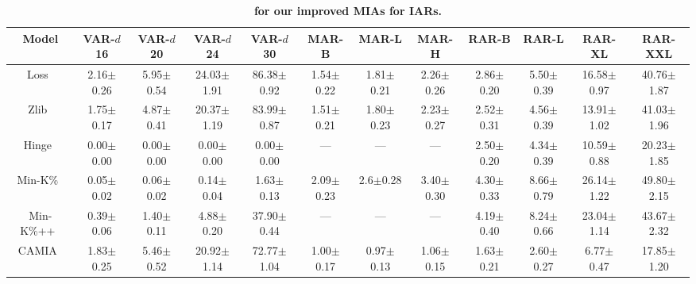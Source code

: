 \begin{table}[h!]
    \centering
    \tiny
\caption{\textbf{\tprat for our improved MIAs for IARs.}}
\setlength{\tabcolsep}{3pt}
\begin{tabular}{cccccccccccc}
\toprule
        Model & VAR-$\mathit{d}$16 & VAR-$\mathit{d}$20 & VAR-$\mathit{d}$24 & VAR-$\mathit{d}$30 & MAR-B & MAR-L & MAR-H & RAR-B & RAR-L & RAR-XL & RAR-XXL \\
\midrule
Loss~\citep{yeom2018lossmia} & 2.16{\tiny $\pm$0.26} & 5.95{\tiny $\pm$0.54} & 24.03{\tiny $\pm$1.91} & 86.38{\tiny $\pm$0.92} & 1.54{\tiny $\pm$0.22} & 1.81{\tiny $\pm$0.21} & 2.26{\tiny $\pm$0.26} & 2.86{\tiny $\pm$0.20} & 5.50{\tiny $\pm$0.39} & 16.58{\tiny $\pm$0.97} & 40.76{\tiny $\pm$1.87} \\
Zlib~\citep{carlini2021extractLLM} & 1.75{\tiny $\pm$0.17} & 4.87{\tiny $\pm$0.41} & 20.37{\tiny $\pm$1.19} & 83.99{\tiny $\pm$0.87} & 1.51{\tiny $\pm$0.21} & 1.80{\tiny $\pm$0.23} & 2.23{\tiny $\pm$0.27} & 2.52{\tiny $\pm$0.31} & 4.56{\tiny $\pm$0.39} & 13.91{\tiny $\pm$1.02} & 41.03{\tiny $\pm$1.96} \\
Hinge~\citep{bertran2024scalable} & 0.00{\tiny $\pm$0.00} & 0.00{\tiny $\pm$0.00} & 0.00{\tiny $\pm$0.00} & 0.00{\tiny $\pm$0.00} & --- & --- & --- & 2.50{\tiny $\pm$0.20} & 4.34{\tiny $\pm$0.39} & 10.59{\tiny $\pm$0.88} & 20.23{\tiny $\pm$1.85} \\
Min-K\%~\citep{shi2024detecting} & 0.05{\tiny $\pm$0.02} & 0.06{\tiny $\pm$0.02} & 0.14{\tiny $\pm$0.04} & 1.63{\tiny $\pm$0.13} & 2.09{\tiny $\pm$0.23} & 2.6{\tiny $\pm$0.28} & 3.40{\tiny $\pm$0.30} & 4.30{\tiny $\pm$0.33} & 8.66{\tiny $\pm$0.79} & 26.14{\tiny $\pm$1.22} & 49.80{\tiny $\pm$2.15} \\
Min-K\%++~\citep{zhang2024min} & 0.39{\tiny $\pm$0.06} & 1.40{\tiny $\pm$0.11} & 4.88{\tiny $\pm$0.20} & 37.90{\tiny $\pm$0.44} & --- & --- & --- & 4.19{\tiny $\pm$0.40} & 8.24{\tiny $\pm$0.66} & 23.04{\tiny $\pm$1.14} & 43.67{\tiny $\pm$2.32} \\
CAMIA~\citep{chang2024context} & 1.83{\tiny $\pm$0.25} & 5.46{\tiny $\pm$0.52} & 20.92{\tiny $\pm$1.14} & 72.77{\tiny $\pm$1.04} & 1.00{\tiny $\pm$0.17} & 0.97{\tiny $\pm$0.13} & 1.06{\tiny $\pm$0.15} & 1.63{\tiny $\pm$0.21} & 2.60{\tiny $\pm$0.27} & 6.77{\tiny $\pm$0.47} & 17.85{\tiny $\pm$1.20} \\
\bottomrule
\end{tabular}
\label{tab:tpr_our_mias}
\end{table}


